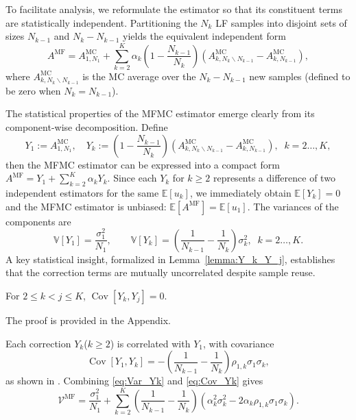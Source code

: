 To facilitate analysis, we reformulate the estimator so that its constituent terms are statistically independent. Partitioning the $N_k$ LF samples into disjoint sets of sizes $N_{k-1}$ and $N_k-N_{k-1}$ yields the equivalent independent form
%
\begin{equation}\label{eq:MFMC_estimator_independent}
    A^{\text{MF}} = A^{\text{MC}}_{1,N_1} +  \sum_{k=2}^K \alpha_k\!\left(1-\frac{N_{k-1}}{N_k}\right)\left(A^{\text{MC}}_{k,N_k\backslash N_{k-1}}-A^{\text{MC}}_{k,N_{k-1}}\right),
\end{equation}
%
where $A_{k,N_k\backslash N_{k-1}}^{\text{MC}}$ is the MC average over the $N_k-N_{k-1}$ new samples (defined to be zero when $N_k=N_{k-1}$).


The statistical properties of the MFMC estimator emerge clearly from its component-wise decomposition. Define
%
\begin{equation}\label{eq:MFMC_Yk}
Y_1 := A^{\text{MC}}_{1,N_1},\quad 
Y_k := \left(1-\frac{N_{k-1}}{N_k}\right)\!\left(A^{\text{MC}}_{k,N_k\backslash N_{k-1}} - A^{\text{MC}}_{k,N_{k-1}}\right), \;\; k=2\ldots, K,
\end{equation}
%
then the MFMC estimator can be expressed into a compact form $A^{\text{MF}} = Y_1 + \sum_{k=2}^K \alpha_k Y_k$. Since each $Y_k$ for $k\ge2$ represents a difference of two independent estimators for the same $\mathbb{E}[u_k]$, we immediately obtain $\mathbb{E}[Y_k]=0$ and the MFMC estimator is unbiased: $\mathbb{E}[A^{\text{MF}}]=\mathbb{E}[u_1]$. The variances of the components are
%
\begin{equation}\label{eq:Var_Yk}
    \mathbb{V}[Y_1] = \frac{\sigma_1^2}{N_1}, \qquad 
    \mathbb{V}[Y_k] = \left(\frac{1}{N_{k-1}} - \frac{1}{N_k}\right)\sigma_k^2, \;\; k=2\ldots, K.
\end{equation}
%
A key statistical insight, formalized in Lemma~\ref{lemma:Y_k_Y_j}, establishes that the correction terms are mutually uncorrelated despite sample reuse.
%
\begin{lemma}\label{lemma:Y_k_Y_j}
For $2\le k<j\le K$, 
$\operatorname{Cov} [Y_k,Y_j ]=0$.
\end{lemma}
%
The proof is provided in the Appendix.

Each correction $Y_k$($k\ge2$) is correlated with $Y_1$, with covariance
\begin{equation}\label{eq:Cov_Yk}
\operatorname{Cov}[Y_1,Y_k] = -\!\left(\frac{1}{N_{k-1}} - \frac{1}{N_k}\right)\rho_{1,k}\sigma_1\sigma_k,
\end{equation}
as shown in \cite[Lemma~3.2]{PeWiGu:2016}. Combining \eqref{eq:Var_Yk} and \eqref{eq:Cov_Yk} gives
%
\begin{equation}\label{eq:MFMC_variance}
    \mathcal{V}^{\text{MF}}
    =\frac{\sigma_1^2}{N_1} 
    + \sum_{k=2}^K \left(\frac{1}{N_{k-1}} - \frac{1}{N_k}\right)\!\left(\alpha_k^2\sigma_k^2 - 2\alpha_k\rho_{1,k}\sigma_1\sigma_k\right).
\end{equation}
%

